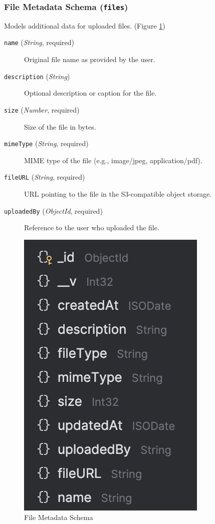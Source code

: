 \subsubsection{File Metadata Schema (\texttt{files})}
Models additional data for uploaded files. (Figure \ref{fig:file-schema})
\begin{description}
  \item [\texttt{name} (\emph{String}, required)]  
    Original file name as provided by the user. 
  \item [\texttt{description} (\emph{String})]  
    Optional description or caption for the file.
  \item [\texttt{size} (\emph{Number}, required)]  
    Size of the file in bytes.
  \item [\texttt{mimeType} (\emph{String}, required)]  
    MIME type of the file (e.g., image/jpeg, application/pdf).
  \item [\texttt{fileURL} (\emph{String}, required)]  
    URL pointing to the file in the S3-compatible object storage.
  \item [\texttt{uploadedBy} (\emph{ObjectId}, required)]
    Reference to the user who uploaded the file.
\end{description}

\begin{figure}[H]
  \centering
  \includegraphics{file-schema.png}
  \caption{File Metadata Schema}
  \label{fig:file-schema}
\end{figure}

